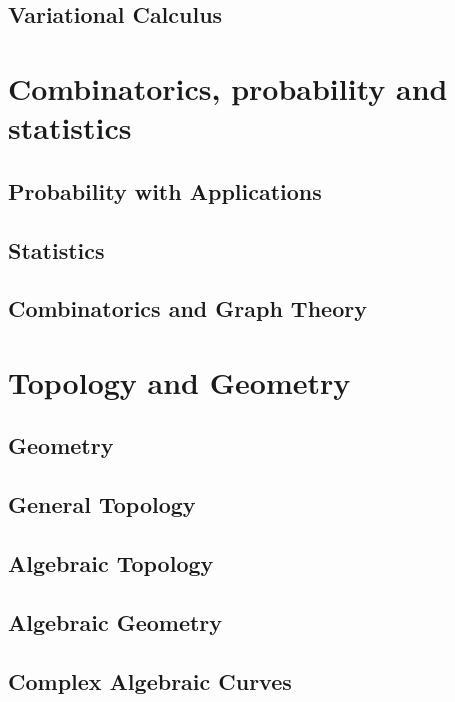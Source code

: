 \documentclass[12pt]{report}
\theoremstyle{definition}
\begin{document}
\chapter{Variational Calculus}\label{cha:variational-calculus}


\part{Combinatorics, probability and statistics}

\chapter{Probability with Applications}\label{cha:prob-with-appl}

\chapter{Statistics}\label{cha:statistics}

\chapter{Combinatorics and Graph Theory}\label{cha:comb-graph-theory}


\part{Topology and Geometry}

\chapter{Geometry}\label{cha:geometry}

\chapter{General Topology}\label{cha:general-topology}

\chapter{Algebraic Topology}\label{cha:algebraic-topology}

\chapter{Algebraic Geometry}\label{cha:algebraic-geometry}

\chapter{Complex Algebraic Curves}\label{cha:compl-algebr-curv}
\end{document}
